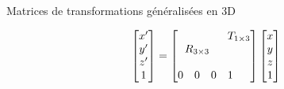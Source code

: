 \documentclass[compress]{beamer}
\def\block(#1,#2)#3{\multicolumn{#2}{c}{\multirow{#1}{*}{$ #3 $}}}
\begin{document}
\begin{frame}{Matrices de transformations généralisées en 3D}
\begin{center}
\[
\begin{bmatrix} x' \\ y' \\ z' \\ 1 \end{bmatrix} = \begin{bmatrix}
    \block(3,3){R_{3 \times 3}} & \block(1,3){T_{1 \times 3}} \\
                 &  &  &  \\
                 &  &  &  \\
                 0 & 0  & 0 & 1
\end{bmatrix} \begin{bmatrix} x \\ y \\ z \\ 1 \end{bmatrix}
\]

\end{center}
\end{frame}
\end{document}
